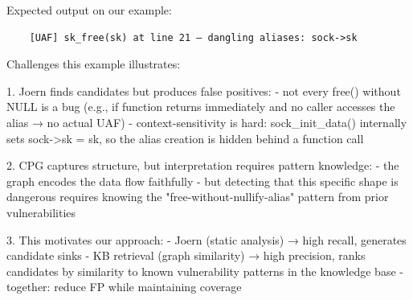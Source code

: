     Expected output on our example:
    \begin{verbatim}
    [UAF] sk_free(sk) at line 21 — dangling aliases: sock->sk
    \end{verbatim}


    Challenges this example illustrates:

    1. Joern finds candidates but produces false positives:
        - not every free() without NULL is a bug (e.g., if function returns immediately
          and no caller accesses the alias → no actual UAF)
        - context-sensitivity is hard: sock_init_data() internally sets sock->sk = sk,
          so the alias creation is hidden behind a function call

    2. CPG captures structure, but interpretation requires pattern knowledge:
        - the graph encodes the data flow faithfully
        - but detecting that this specific shape is dangerous requires knowing
          the "free-without-nullify-alias" pattern from prior vulnerabilities

    3. This motivates our approach:
        - Joern (static analysis) → high recall, generates candidate sinks
        - KB retrieval (graph similarity) → high precision, ranks candidates
          by similarity to known vulnerability patterns in the knowledge base
        - together: reduce FP while maintaining coverage